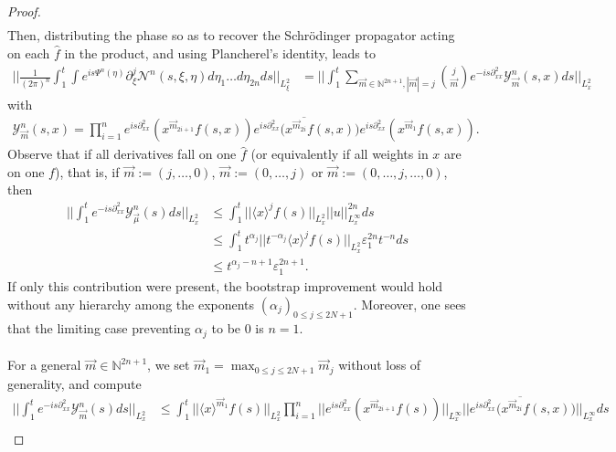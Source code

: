 \documentclass[a4paper, 15pt]{article}
\numberwithin{equation}{section}
\begin{document}
\begin{proof}
\begin{align}
\end{align}
Then, distributing the phase so as to recover the Schrödinger propagator acting on each $\hat{f}$ in the product, and using Plancherel's identity, leads to
\begin{align*}
||\frac{1}{(2\pi)^{n}}\int^t_1\int e^{is\Psi^n(\eta)}\partial^{j}_\xi\mathcal{N}^n(s,\xi,\eta)d\eta_1\dots d\eta_{2n}ds||_{L^2_\xi}&=||\int^t_1\sum_{\overrightarrow{m}\in\mathbb{N}^{2n+1}, |\overrightarrow{m}|=j}\binom{j}{\overrightarrow{m}}e^{-is\partial^2_{xx}}\mathcal{Y}^{n}_{\overrightarrow{m}}(s,x)ds||_{L^2_x}
\end{align*}
with 
\begin{align}
\mathcal{Y}^{n}_{\overrightarrow{m}}(s,x)=\prod^{n}_{i=1}e^{is\partial^2_{xx}}(x^{\overrightarrow{m}_{2i+1}}f(s,x))\overline{e^{is\partial^2_{xx}}(x^{\overrightarrow{m}_{2i}}f(s,x)})e^{is\partial^2_{xx}}(x^{\overrightarrow{m}_{1}}f(s,x)).
\end{align}
Observe that if all derivatives fall on one $\hat{f}$ (or equivalently if all weights in $x$ are on one $f$), that is, if $\overrightarrow{m}:=(j,\dots,0)$, $ \overrightarrow{m}:=(0,\dots,j)$ or $\overrightarrow{m}:=(0,\dots,j,\dots,0)$, then 
\begin{align*}
||\int^t_1e^{-is\partial^2_{xx}}\mathcal{Y}^{n}_{\overrightarrow{\mu}}(s)ds||_{L^2_x}&\leq \int^t_1||\langle x\rangle^{j}f(s)||_{L^2_x}||u||^{2n}_{L^\infty_x}ds\\
&\leq \int^t_1t^{\alpha_j}||t^{-\alpha_j}\langle x\rangle^{j}f(s)||_{L^2_x}\varepsilon^{2n}_1t^{-n}ds\\
&\leq t^{\alpha_j-n+1}\varepsilon^{2n+1}_1.
\end{align*}
If only this contribution were present, the bootstrap improvement would hold without any hierarchy among the exponents $(\alpha_j)_{0\leq j\leq 2N+1}$. Moreover, one sees that the limiting case preventing $\alpha_j$ to be $0$ is $n=1$. \\\\
For a general $\overrightarrow{m}\in\mathbb{N}^{2n+1}$, we set $\overrightarrow{m}_1=\max_{0\leq j\leq 2N+1}\overrightarrow{m}_j$ without loss of generality, and compute
\begin{align*}
||\int^t_1e^{-is\partial^2_{xx}}\mathcal{Y}^{n}_{\overrightarrow{m}}(s)ds||_{L^2_x}&\leq \int^t_1||\langle x\rangle^{\overrightarrow{m}_{1}}f(s)||_{L^2_x}\prod^{n}_{i=1}||e^{is\partial^2_{xx}}(x^{\overrightarrow{m}_{2i+1}}f(s))||_{L^\infty_x}||\overline{e^{is\partial^2_{xx}}(x^{\overrightarrow{m}_{2i}}f(s,x)})||_{L^\infty_x}ds\\

\end{align*}
\end{proof}
\end{document}
